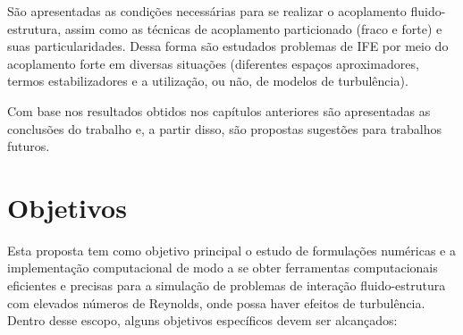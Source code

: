 {        %

         São apresentadas as condições necessárias para se realizar o acoplamento fluido-estrutura, assim como as técnicas de acoplamento particionado (fraco e forte) e suas particularidades. Dessa forma são estudados problemas de IFE por meio do acoplamento forte em diversas situações (diferentes espaços aproximadores, termos estabilizadores e a utilização, ou não, de modelos de turbulência).

         Com base nos resultados obtidos nos capítulos anteriores são apresentadas as conclusões do trabalho e, a partir disso, são propostas sugestões para trabalhos futuros.
    }




\section{Objetivos}

Esta proposta tem como objetivo principal o estudo de formulações numéricas e a implementação computacional de modo a se obter ferramentas computacionais eficientes e precisas para a simulação de problemas de interação fluido-estrutura com elevados números de Reynolds, onde possa haver efeitos de turbulência. Dentro desse escopo, alguns objetivos específicos devem ser alcançados:

